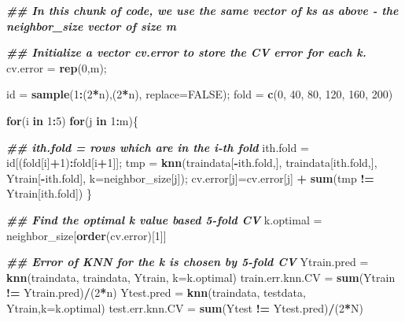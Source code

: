 \documentclass[
]{book}
\newenvironment{Shaded}{\begin{snugshade}}{\end{snugshade}}
\newcommand{\AttributeTok}[1]{\textcolor[rgb]{0.13,0.29,0.53}{#1}}
\newcommand{\ConstantTok}[1]{\textcolor[rgb]{0.56,0.35,0.01}{#1}}
\newcommand{\ControlFlowTok}[1]{\textcolor[rgb]{0.13,0.29,0.53}{\textbf{#1}}}
\newcommand{\DecValTok}[1]{\textcolor[rgb]{0.00,0.00,0.81}{#1}}
\newcommand{\DocumentationTok}[1]{\textcolor[rgb]{0.56,0.35,0.01}{\textbf{\textit{#1}}}}
\newcommand{\FunctionTok}[1]{\textcolor[rgb]{0.13,0.29,0.53}{\textbf{#1}}}
\newcommand{\NormalTok}[1]{#1}
\newcommand{\OtherTok}[1]{\textcolor[rgb]{0.56,0.35,0.01}{#1}}
\newcommand{\SpecialCharTok}[1]{\textcolor[rgb]{0.81,0.36,0.00}{\textbf{#1}}}
\begin{document}
\begin{Shaded}
\begin{Highlighting}[]
\DocumentationTok{\#\# In this chunk of code, we use the same vector of k\textquotesingle{}s as above {-} the neighbor\_size vector of size m}

\DocumentationTok{\#\# Initialize a vector cv.error to store the CV error for each k.}
\NormalTok{cv.error }\OtherTok{=} \FunctionTok{rep}\NormalTok{(}\DecValTok{0}\NormalTok{,m);}


\NormalTok{id }\OtherTok{=} \FunctionTok{sample}\NormalTok{(}\DecValTok{1}\SpecialCharTok{:}\NormalTok{(}\DecValTok{2}\SpecialCharTok{*}\NormalTok{n),(}\DecValTok{2}\SpecialCharTok{*}\NormalTok{n), }\AttributeTok{replace=}\ConstantTok{FALSE}\NormalTok{);}
\NormalTok{fold }\OtherTok{=} \FunctionTok{c}\NormalTok{(}\DecValTok{0}\NormalTok{,  }\DecValTok{40}\NormalTok{,  }\DecValTok{80}\NormalTok{, }\DecValTok{120}\NormalTok{, }\DecValTok{160}\NormalTok{, }\DecValTok{200}\NormalTok{)}

\ControlFlowTok{for}\NormalTok{(i }\ControlFlowTok{in} \DecValTok{1}\SpecialCharTok{:}\DecValTok{5}\NormalTok{)}
    \ControlFlowTok{for}\NormalTok{(j }\ControlFlowTok{in} \DecValTok{1}\SpecialCharTok{:}\NormalTok{m)\{}
      
      \DocumentationTok{\#\# ith.fold = rows which are in the i{-}th fold}
\NormalTok{      ith.fold }\OtherTok{=}\NormalTok{ id[(fold[i]}\SpecialCharTok{+}\DecValTok{1}\NormalTok{)}\SpecialCharTok{:}\NormalTok{fold[i}\SpecialCharTok{+}\DecValTok{1}\NormalTok{]];   }
\NormalTok{      tmp }\OtherTok{=} \FunctionTok{knn}\NormalTok{(traindata[}\SpecialCharTok{{-}}\NormalTok{ith.fold,], traindata[ith.fold,], Ytrain[}\SpecialCharTok{{-}}\NormalTok{ith.fold], }\AttributeTok{k=}\NormalTok{neighbor\_size[j]);}
\NormalTok{      cv.error[j]}\OtherTok{=}\NormalTok{cv.error[j] }\SpecialCharTok{+} \FunctionTok{sum}\NormalTok{(tmp }\SpecialCharTok{!=}\NormalTok{ Ytrain[ith.fold])}
\NormalTok{    \}}

\DocumentationTok{\#\# Find the optimal k value based 5{-}fold CV}
\NormalTok{k.optimal }\OtherTok{=}\NormalTok{ neighbor\_size[}\FunctionTok{order}\NormalTok{(cv.error)[}\DecValTok{1}\NormalTok{]]  }

\DocumentationTok{\#\# Error of KNN for the k is chosen by 5{-}fold CV}
\NormalTok{Ytrain.pred }\OtherTok{=} \FunctionTok{knn}\NormalTok{(traindata, traindata, Ytrain, }\AttributeTok{k=}\NormalTok{k.optimal)}
\NormalTok{train.err.knn.CV }\OtherTok{=} \FunctionTok{sum}\NormalTok{(Ytrain }\SpecialCharTok{!=}\NormalTok{ Ytrain.pred)}\SpecialCharTok{/}\NormalTok{(}\DecValTok{2}\SpecialCharTok{*}\NormalTok{n)}
\NormalTok{Ytest.pred }\OtherTok{=} \FunctionTok{knn}\NormalTok{(traindata, testdata, Ytrain,}\AttributeTok{k=}\NormalTok{k.optimal)}
\NormalTok{test.err.knn.CV }\OtherTok{=} \FunctionTok{sum}\NormalTok{(Ytest }\SpecialCharTok{!=}\NormalTok{ Ytest.pred)}\SpecialCharTok{/}\NormalTok{(}\DecValTok{2}\SpecialCharTok{*}\NormalTok{N)  }
\end{Highlighting}
\end{Shaded}
\end{document}
